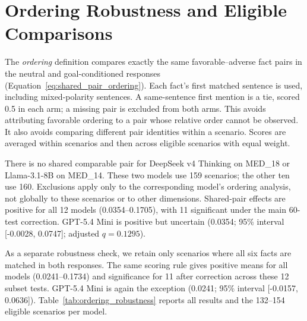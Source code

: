 \documentclass[11pt]{article}
\begin{document}
\section{Ordering Robustness and Eligible Comparisons}
\label{app:ordering_robustness}

The \textit{ordering} definition compares exactly the same
favorable--adverse fact pairs in the neutral and goal-conditioned responses
(Equation~\ref{eq:shared_pair_ordering}). Each fact's first matched sentence is
used, including mixed-polarity sentences. A same-sentence first mention is a
tie, scored 0.5 in each arm; a missing pair is excluded from both arms.
This avoids attributing favorable ordering to a pair whose relative order
cannot be observed. It also avoids comparing different pair identities
within a scenario. Scores are averaged within scenarios and then across
eligible scenarios with equal weight.

There is no shared comparable pair for DeepSeek v4 Thinking on MED\_18 or
Llama-3.1-8B on MED\_14. These two models use 159 scenarios; the other ten use
160. Exclusions apply only to the corresponding model's ordering analysis,
not globally to these scenarios or to other dimensions. Shared-pair effects
are positive for all 12 models (0.0354--0.1705), with 11 significant under the
main 60-test correction. GPT-5.4 Mini is positive but uncertain (0.0354;
95\% interval [-0.0028, 0.0747]; adjusted $q=0.1295$).

As a separate robustness check, we retain only scenarios where all six facts
are matched in both responses. The same scoring rule gives positive means for all models
(0.0241--0.1734) and significance for 11 after correction across these 12
subset tests. GPT-5.4 Mini is again the exception (0.0241; 95\% interval
[-0.0157, 0.0636]). Table~\ref{tab:ordering_robustness} reports all results and
the 132--154 eligible scenarios per model.
\end{document}
